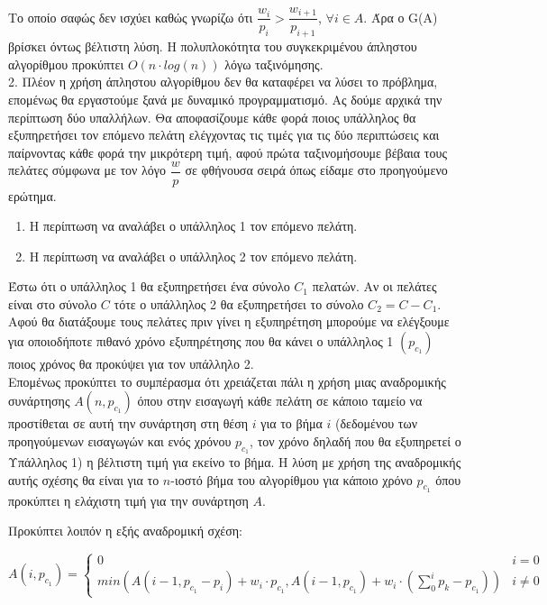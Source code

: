 \documentclass{article} \usepackage[greek,english]{babel}
\begin{document}
Το οποίο σαφώς δεν ισχύει καθώς γνωρίζω ότι $\dfrac{w_{i}}{p_{i}} > \dfrac{w_{i+1}}{p_{i+1}}$,  $\forall
i \in A$. Άρα ο G(A) βρίσκει όντως βέλτιστη λύση. Η πολυπλοκότητα του συγκεκριμένου άπληστου
αλγορίθμου προκύπτει $O(n\cdot log(n))$ λόγω ταξινόμησης. \\

2. Πλέον η χρήση άπληστου αλγορίθμου δεν θα καταφέρει να λύσει το πρόβλημα, επομένως θα εργαστούμε
ξανά με δυναμικό προγραμματισμό. Ας δούμε αρχικά την περίπτωση δύο υπαλλήλων. Θα αποφασίζουμε κάθε
φορά ποιος υπάλληλος θα εξυπηρετήσει τον επόμενο πελάτη ελέγχοντας τις τιμές για τις δύο περιπτώσεις
και παίρνοντας κάθε φορά την μικρότερη τιμή, αφού πρώτα ταξινομήσουμε βέβαια τους πελάτες σύμφωνα
με τον λόγο $\dfrac{w}{p}$ σε φθήνουσα σειρά όπως είδαμε στο προηγούμενο ερώτημα.\\
\begin{enumerate}
    \item{Η περίπτωση να αναλάβει ο υπάλληλος 1 τον επόμενο πελάτη.}
    \item{Η περίπτωση να αναλάβει ο υπάλληλος 2 τον επόμενο πελάτη.}
\end{enumerate}

Έστω ότι ο υπάλληλος 1 θα εξυπηρετήσει ένα σύνολο $C_1$ πελατών. Αν οι πελάτες είναι στο σύνολο $C$
τότε ο υπάλληλος 2 θα εξυπηρετήσει το σύνολο $C_2 = C - C_1$. Αφού θα διατάξουμε τους πελάτες πριν
γίνει η εξυπηρέτηση μπορούμε να ελέγξουμε για οποιοδήποτε πιθανό χρόνο εξυπηρέτησης που θα κάνει 
ο υπάλληλος 1 $(p_{c_1})$ ποιος χρόνος θα προκύψει για τον υπάλληλο 2. \\

Επομένως προκύπτει το συμπέρασμα ότι χρειάζεται πάλι η χρήση μιας αναδρομικής συνάρτησης 
$A(n,p_{c_1})$ όπου στην εισαγωγή κάθε πελάτη σε κάποιο ταμείο να προστίθεται σε αυτή την
συνάρτηση στη θέση $i$ για το βήμα $i$ (δεδομένου των προηγούμενων εισαγωγών και ενός χρόνου $p_{c_1}$,
τον χρόνο δηλαδή που θα εξυπηρετεί ο Υπάλληλος 1) η βέλτιστη τιμή για εκείνο το βήμα. Η λύση με χρήση
της αναδρομικής αυτής σχέσης θα είναι για το $n$-ιοστό βήμα του αλγορίθμου για κάποιο χρόνο $p_{c_1}$
όπου προκύπτει η ελάχιστη τιμή για την συνάρτηση $Α$.\\ 
\pagebreak


Προκύπτει λοιπόν η εξής αναδρομική σχέση:\\
\begin{center}
    $A(i,p_{c_1}) =
    \begin{cases}
        0 & i = 0 \\
        min(A(i-1,p_{c_1}-p_i) + w_i\cdot p_{c_1},
            A(i-1,p_{c_1}) + w_i \cdot(\sum_{0}^{i}{p_k} - p_{c_1})) & i \neq 0
    \end{cases}$
\end{center}\\ 
\end{document}
